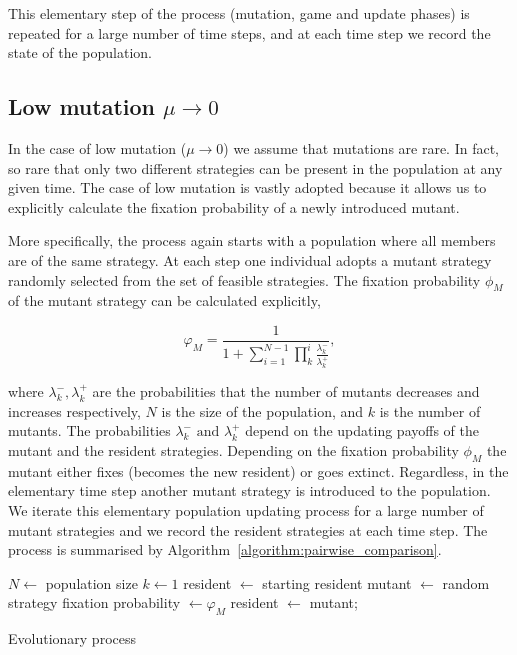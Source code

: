 \documentclass[11pt]{article}
\theoremstyle{plainCl1}
\theoremstyle{plainCl2}
\begin{document}
This elementary step of the process (mutation, game and update phases) is
repeated for a large number of time steps, and at each time step we record the
state of the population.

\subsection{Low mutation \(\mu \rightarrow 0\)}

In the case of low mutation (\(\mu \rightarrow 0\)) we assume that mutations are
rare. In fact, so rare that only two different strategies can be present in the
population at any given time. The case of low mutation is vastly adopted because
it allows us to explicitly calculate the fixation probability of a newly
introduced mutant.

More specifically, the process again starts with a population where all members are of the same
strategy. At each step one individual adopts a mutant strategy randomly selected
from the set of feasible strategies. The fixation probability \(\phi_{M}\) of the
mutant strategy can be calculated explicitly,

\begin{equation}\label{eq:appendix_fixation_probability}
    \varphi_{M} = \frac{1}{1+\sum\limits_{i=1}^{N-1}\prod\limits_k^i \frac{\lambda^-_k}{\lambda^+_k}},
\end{equation}

where \(\lambda^-_k, \lambda^+_k\) are the probabilities that the number of
mutants decreases and increases respectively, \(N\) is the size of the
population, and \(k\) is the number of mutants. The probabilities \(\lambda^-_k
\text{ and } \lambda^+_k\) depend on the updating payoffs of the mutant and the
resident strategies. Depending on the fixation probability \(\phi_{M}\) the
mutant either fixes (becomes the new resident) or goes extinct. Regardless, in
the elementary time step another mutant strategy is introduced to the
population. We iterate this elementary population updating process for a large
number of mutant strategies and we record the resident strategies at each time
step. The process is summarised by Algorithm~\ref{algorithm:pairwise_comparison}.

\begin{algorithm}[!htbp]
  \SetAlgoLined
  $N \leftarrow$ population size\;
  $k \leftarrow 1$\; resident
   $\leftarrow$ starting resident\;
   {mutant $\leftarrow$ random strategy\;
   fixation probability $\leftarrow \varphi_M $\;
   {resident $\leftarrow$ mutant;}}
   \caption{Evolutionary process}\label{algorithm:pairwise_comparison}
\end{algorithm}
\end{document}
